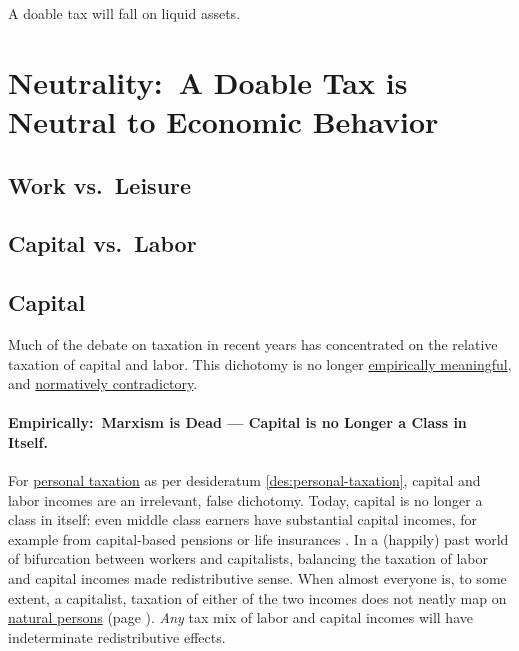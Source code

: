 \begin{desideratum}
	\label{des:liquid-assets}
	A doable tax will fall on liquid assets.
\end{desideratum}

\section[Neutrality]{Neutrality:~A Doable Tax is Neutral to Economic Behavior}
	\label{sec:tax-neutrality}

\subsection{Work vs.\ Leisure}



\subsection{Capital vs.\ Labor} %

\subsection{Capital}
Much of the debate on taxation in recent years has concentrated on the relative taxation of capital and labor.
This dichotomy is no longer \href{sec:CapitalNoClass}{empirically meaningful}, and \href{sec:savings-norms}{normatively contradictory}.

\paragraph{Empirically:~Marxism is Dead --- Capital is no Longer a Class in Itself.}
	\label{sec:CapitalNoClass}
For \href{des:personal-taxation}{personal taxation} as per desideratum \ref{des:personal-taxation}, capital and labor incomes are an irrelevant, false dichotomy.
Today, capital is no longer a class in itself:
even middle class earners have substantial capital incomes, for example from capital-based pensions or life insurances \citep[XV]{Grabka2007a}.
In a (happily) past world of bifurcation between workers and capitalists, balancing the taxation of labor and capital incomes made redistributive sense.
When almost everyone is, to some extent, a capitalist, taxation of either of the two incomes does not neatly map on \hyperref[des:personal-taxation]{natural persons} (page \pageref{des:personal-taxation}).
\emph{Any} tax mix of labor and capital incomes will have indeterminate redistributive effects.

